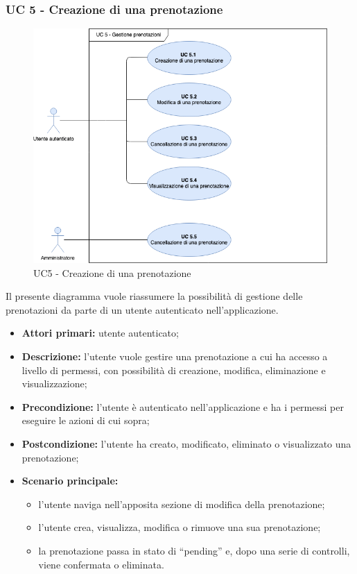 \subsubsection{UC 5 - Creazione di una prenotazione}

\begin{figure}[h]
  \centering
    \includegraphics[scale=0.5]{CasiDUso//Immagini/UC5.png}
  \caption{UC5  - Creazione di una prenotazione}
\end{figure}

Il presente diagramma vuole riassumere la possibilità di gestione delle prenotazioni da parte di un utente autenticato nell’applicazione.

\begin{itemize}
\item \textbf{Attori primari:} utente autenticato;
\item \textbf{Descrizione:} l’utente vuole gestire una prenotazione a cui ha accesso a livello di permessi, con possibilità di creazione, modifica, eliminazione e visualizzazione;
\item \textbf{Precondizione:} l’utente è autenticato nell’applicazione e ha i permessi per eseguire le azioni di cui sopra;
\item \textbf{Postcondizione:} l’utente ha creato, modificato, eliminato o visualizzato una prenotazione;\item \textbf{Scenario principale:} 
	\begin{itemize}
		\item l’utente naviga nell’apposita sezione di modifica della prenotazione;
		\item l’utente crea, visualizza, modifica o rimuove una sua prenotazione;
		\item la prenotazione passa in stato di “pending” e, dopo una serie di controlli, viene confermata o eliminata.
	\end{itemize}
\end{itemize}

